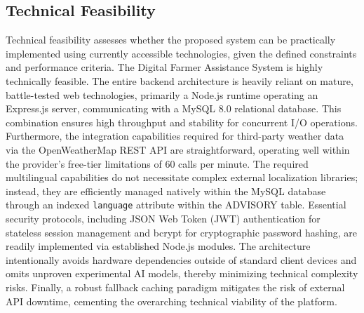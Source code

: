 \subsection{Technical Feasibility}
Technical feasibility assesses whether the proposed system can be practically implemented using currently accessible technologies, given the defined constraints and performance criteria. The Digital Farmer Assistance System is highly technically feasible. The entire backend architecture is heavily reliant on mature, battle-tested web technologies, primarily a Node.js runtime operating an Express.js server, communicating with a MySQL 8.0 relational database. This combination ensures high throughput and stability for concurrent I/O operations. Furthermore, the integration capabilities required for third-party weather data via the OpenWeatherMap REST API are straightforward, operating well within the provider's free-tier limitations of 60 calls per minute. The required multilingual capabilities do not necessitate complex external localization libraries; instead, they are efficiently managed natively within the MySQL database through an indexed \texttt{language} attribute within the ADVISORY table. Essential security protocols, including JSON Web Token (JWT) authentication for stateless session management and bcrypt for cryptographic password hashing, are readily implemented via established Node.js modules. The architecture intentionally avoids hardware dependencies outside of standard client devices and omits unproven experimental AI models, thereby minimizing technical complexity risks. Finally, a robust fallback caching paradigm mitigates the risk of external API downtime, cementing the overarching technical viability of the platform.

